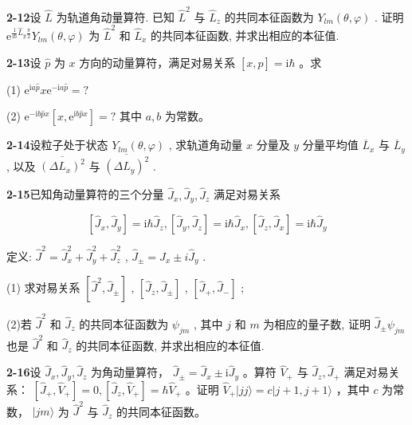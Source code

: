 \vfill

\newpage
\vfill

\noindent
\textbf{2-12}\quad 设 $\hat{L}$ 为轨道角动量算符. 已知 $\hat{L}^2$ 与 $\hat{L}_z$ 的共同本征函数为 $Y_{lm}(\theta, \varphi)$ . 证明 $\mathrm{e}^{\frac{1}{\mathrm{i}\hbar}\hat{L}_y\frac{\pi}{2}} Y_{lm}(\theta, \varphi)$ 为 $\hat{L}^2$ 和 $\hat{L}_x$ 的共同本征函数, 并求出相应的本征值.

\vfill

\newpage
\vfill

\noindent
\textbf{2-13}\quad 设 $\hat{p}$ 为 $x$ 方向的动量算符，满足对易关系 $[x, \hat{p}] = \mathrm{i}\hbar$ 。求 

(1) $\mathrm{e}^{\mathrm{i}a\hat{p}} x \mathrm{e}^{-\mathrm{i}a\hat{p}} = ?$ 

(2) $\mathrm{e}^{-\mathrm{i}b\hat{p} x} [x, \mathrm{e}^{\mathrm{i}b\hat{p} x}] = ?$ 其中 $a, b$ 为常数。

\vfill

\newpage
\vfill

\noindent
\textbf{2-14}\quad 设粒子处于状态 $Y_{lm}(\theta, \varphi)$ , 求轨道角动量 $x$ 分量及 $y$ 分量平均值 $\overline{L}_x$ 与 $\overline{L}_y$ , 以及 $\overline{(\Delta L_x)^2}$ 与 $\overline{(\Delta L_y)^2}$ .

\vfill

\newpage
\vfill

\noindent
\textbf{2-15}\quad 已知角动量算符的三个分量 $\hat{J}_x, \hat{J}_y, \hat{J}_z$ 满足对易关系

$$
[ \hat {J} _ {x}, \hat {J} _ {y} ] = \mathrm{i} \hbar \hat {J} _ {z}, [ \hat {J} _ {y}, \hat {J} _ {z} ] = \mathrm{i} \hbar \hat {J} _ {x}, [ \hat {J} _ {z}, \hat {J} _ {x} ] = \mathrm{i} \hbar \hat {J} _ {y}
$$

定义: $\hat{J}^2 = \hat{J}_x^2 + \hat{J}_y^2 + \hat{J}_z^2$ , $\hat{J}_{\pm} = \hat{J}_x \pm i\hat{J}_y$ . 

(1) 求对易关系 $[\hat{J}^2, \hat{J}_{\pm}]$ , $[\hat{J}_z, \hat{J}_{\pm}]$ , $[\hat{J}_{+}, \hat{J}_{-}]$ ;

(2)若 $\hat{J}^2$ 和 $\hat{J}_z$ 的共同本征函数为 $\psi_{jm}$ , 其中 $j$ 和 $m$ 为相应的量子数, 证明 $\hat{J}_{\pm} \psi_{jm}$ 也是 $\hat{J}^2$ 和 $\hat{J}_z$ 的共同本征函数, 并求出相应的本征值.

\vfill

\newpage
\vfill

\noindent
\textbf{2-16}\quad 设 $\hat{J}_x, \hat{J}_y, \hat{J}_z$ 为角动量算符， $\hat{J}_{\pm} = \hat{J}_x \pm \mathrm{i}\hat{J}_y$ 。算符 $\hat{V}_{+}$ 与 $\hat{J}_z, \hat{J}_{+}$ 满足对易关系： $[\hat{J}_{+}, \hat{V}_{+}] = 0, [\hat{J}_z, \hat{V}_{+}] = \hbar \hat{V}_{+}$ 。证明 $\hat{V}_{+}|jj\rangle = c|j + 1, j + 1\rangle$ ，其中 $c$ 为常数， $|jm\rangle$ 为 $\hat{J}^2$ 与 $\hat{J}_z$ 的共同本征函数。

